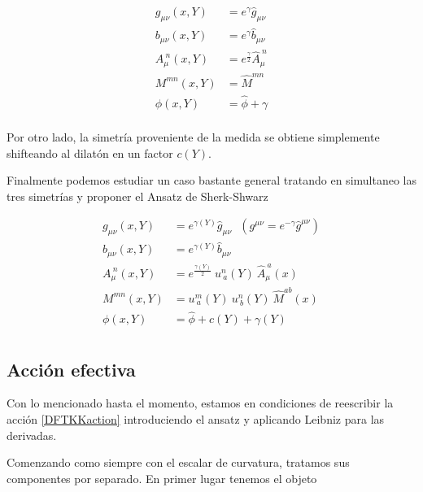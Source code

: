 \documentclass{article}
\numberwithin{equation}{section}
\begin{document}
\begin{equation}
\begin{aligned}
g_{\mu \nu}(x,Y)&= e^{\gamma}\hat{g}_{\mu \nu}\\
b_{\mu \nu}(x,Y)&= e^{\gamma} \hat{b}_{\mu \nu}\\
A_{\mu}^{\ n}(x,Y)&= e^{\frac{\gamma}{2}} \hat{A}_{\mu}^{\ n}\\
M^{m n}(x,Y)&= \hat{M}^{m n}\\
\phi(x,Y)&= \hat{\phi} + \gamma\\
\end{aligned}
\end{equation} 

Por otro lado, la simetría proveniente de la medida se obtiene simplemente shifteando al dilatón en un factor $ c(Y) $.

Finalmente podemos estudiar un caso bastante general tratando en simultaneo las tres simetrías y proponer el Ansatz de Sherk-Shwarz\\

\begin{boxquation}
	\begin{equation}
	\begin{aligned}
	g_{\mu \nu}(x,Y)&= e^{\gamma(Y)}\hat{g}_{\mu \nu} \ \ \ (g^{\mu \nu} = e^{-\gamma}\hat{g}^{\mu \nu})\\
	b_{\mu \nu}(x,Y)&= e^{\gamma(Y)} \hat{b}_{\mu \nu}\\
	A_{\mu}^{\ n}(x,Y)&= e^{\frac{\gamma(Y)}{2}} \ u^{n}_{\ a}(Y) \ \hat{A}_{\mu}^{\ a}(x)\\
	M^{m n}(x,Y)&= u^{m}_{\ a}(Y) \ u^{n}_{\ b}(Y) \ \hat{M}^{a b}(x)\\
	\phi(x,Y)&= \hat{\phi} + c(Y) + \gamma(Y)\\
	\end{aligned}
	\end{equation}
\end{boxquation}

\vspace{.5cm}

\subsection{\textcolor{white!60!teal}{Acción efectiva}}

Con lo mencionado hasta el momento, estamos en condiciones de reescribir la acción \ref{DFTKKaction}
introduciendo el ansatz y aplicando Leibniz para las derivadas.

Comenzando como siempre con el escalar de curvatura, tratamos sus componentes por separado. En primer lugar tenemos el objeto
\end{document}
